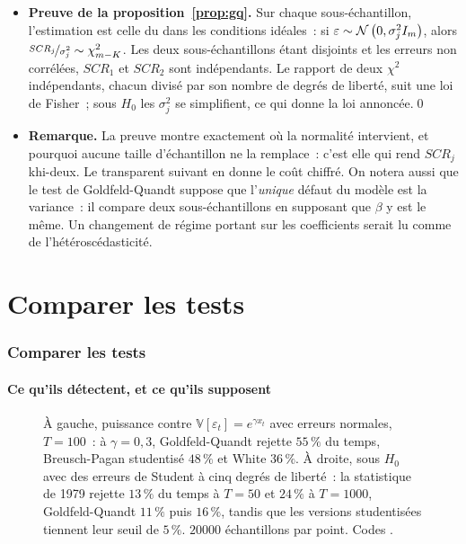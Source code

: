 \documentclass[10pt]{beamer}
\begin{document}
\begin{notes}

  \begin{itemize}

  \item \textbf{Preuve de la proposition~\ref{prop:gq}.} Sur chaque
    sous-échantillon, l'estimation est celle du  dans les
    conditions idéales~: si $\varepsilon\sim\mathcal N\left(0,\sigma_j^2I_m\right)$, alors
    $\nicefrac{SCR_j}{\sigma_j^2}\sim\chi^2_{m-K}$. Les deux sous-échantillons
    étant disjoints et les erreurs non corrélées, $SCR_1$ et $SCR_2$ sont
    indépendants. Le rapport de deux $\chi^2$ indépendants, chacun divisé par
    son nombre de degrés de liberté, suit une loi de Fisher~; sous $H_0$ les
    $\sigma_j^2$ se simplifient, ce qui donne la loi annoncée.\qed\newline

  \item \textbf{Remarque.} La preuve montre exactement où la normalité
    intervient, et pourquoi aucune taille d'échantillon ne la remplace~: c'est
    elle qui rend $SCR_j$ khi-deux. Le transparent suivant en donne le coût
    chiffré. On notera aussi que le test de Goldfeld-Quandt suppose que
    l'\emph{unique} défaut du modèle est la variance~: il compare deux
    sous-échantillons en supposant que $\beta$ y est le même. Un changement de
    régime portant sur les coefficients serait lu comme de
    l'hétéroscédasticité.

  \end{itemize}

\end{notes}


\section{Comparer les tests}

\begin{frame}[c]
  \frametitle{Comparer les tests}
  \framesubtitle{Ce qu'ils détectent, et ce qu'ils supposent}

  \begin{figure}
    \centering
    \scalebox{.44}{}
    \caption{À gauche, puissance contre $\mathbb V[\varepsilon_t]=e^{\gamma x_t}$
      avec erreurs normales, $T=100$~: à $\gamma=0{,}3$, Goldfeld-Quandt rejette
      $55\,\%$ du temps, Breusch-Pagan studentisé $48\,\%$ et White $36\,\%$. À
      droite, sous $H_0$ avec des erreurs de Student à cinq degrés de liberté~:
      la statistique de 1979 rejette $13\,\%$ du temps à $T=50$ et $24\,\%$ à
      $T=1000$, Goldfeld-Quandt $11\,\%$ puis $16\,\%$, tandis que les versions
      studentisées tiennent leur seuil de $5\,\%$. $20000$ échantillons par
      point. Codes .}
  \end{figure}

\end{frame}
\end{document}

